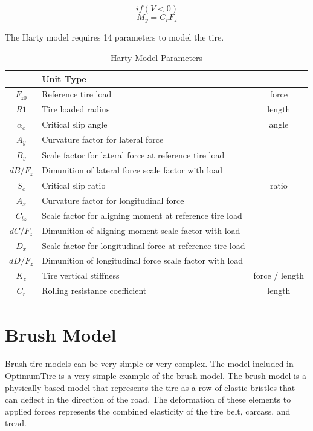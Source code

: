 \begin{displaymath}if( V < 0)\end{displaymath}
\begin{displaymath}
M_{y}=C_{r}F_{z}
\end{displaymath}

The Harty model requires 14 parameters to model the tire.

\begin{table}[H]
\centering
\begin{tabular}{|c|l|c|}
		\hline
		\rowcolor{tblue}\multicolumn{2}{|c|}{\cellcolor{tblue}\textbf{Harty Model Parameters}}& Unit Type\\ \hline
		$F_{z0}$	& Reference tire load & force \\ \hline
		$R1$	&	Tire loaded radius & length \\ \hline
		$\alpha_c$	&		Critical slip angle & angle \\ \hline
		$A_y$	&	Curvature factor for lateral force  & \\ \hline
		$B_y$	&	Scale factor for lateral force at reference tire load & \\ \hline
		$dB/F_z$ &	Dimunition of lateral force scale factor with load & \\ \hline
		$S_c$	&	Critical slip ratio & ratio \\ \hline
		$A_x$	&	Curvature factor for longitudinal force & \\ \hline
		$C_{tz}$	&	Scale factor for aligning moment at reference tire load & \\ \hline
		$dC/F_z$ &	Dimunition of aligning moment scale factor with load & \\ \hline
		$D_x$	&	Scale factor for longitudinal force at reference tire load & \\ \hline
		$dD/F_z$ &	Dimunition of longitudinal force scale factor with load & \\ \hline
		$K_z$ & Tire vertical stiffness & force / length \\ \hline
		$C_r$ & Rolling resistance coefficient & length \\ \hline
		
		\end{tabular}
	\caption{Harty Model Parameters}
	\label{tbl:HartyModelParameters}
\end{table}

\section{Brush Model}
\label{sec:BrushModel}
Brush tire models can be very simple or very complex. The model included in OptimumTire is a very simple example of the brush model. The brush model is a physically based model that represents the tire as a row of elastic bristles that can deflect in the direction of the road. The deformation of these elements to applied forces represents the combined elasticity of the tire belt, carcass, and tread.


